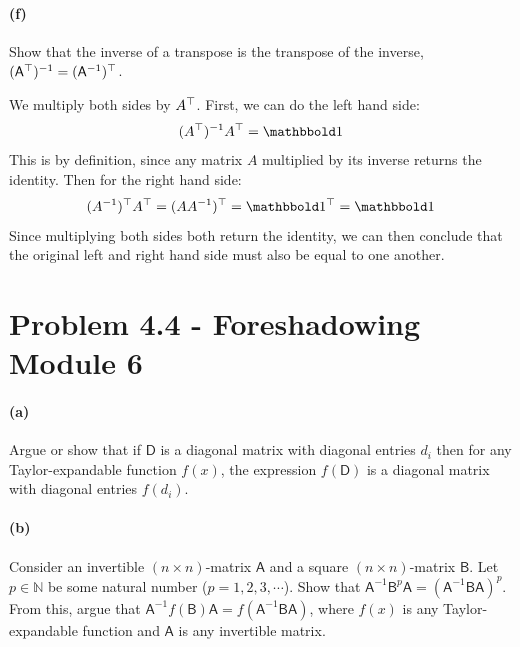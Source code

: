 \documentclass{article}
\begin{document}
\paragraph{(f)}		
Show that the inverse of a transpose is the transpose of the inverse, $(\mathsf{A}^{\top})^{-1} = (\mathsf{A}^{-1})^{\top}$.

\begin{solution}
	We multiply both sides by $A^\top$. First, we can do the left hand side:
	\[
	 (A^\T)^{-1} A^\T = \mathbbold 1
	\] 
	This is by definition, since any matrix $A$ multiplied by its inverse returns the identity. Then for the 
	right hand side:
	\[
		(A^{-1})^\T A^\T = (A A^{-1})^\T = \mathbbold 1^\T = \mathbbold 1
	\] 
	Since multiplying both sides both return the identity, we can then conclude that the original left and 
	right hand side must also be equal to one another. 
\end{solution}
\bigskip
\dphline
\pagebreak
\section*{Problem 4.4 - Foreshadowing Module 6}


\paragraph{(a)}		\extrapart
Argue or show that if $\mathsf{D}$ is a diagonal matrix with diagonal entries $d_{i}$ then for any Taylor-expandable function $f(x)$, the expression $f(\mathsf{D})$ is a 
diagonal matrix with diagonal entries $f(d_{i})$.\\


\paragraph{(b)}
Consider an invertible $(n\times n)$-matrix $\mathsf{A}$ and a square $(n\times n)$-matrix $\mathsf{B}$.  Let $p\in\mathbb{N}$ be some natural number ($p=1,2,3,\cdots$).
Show that $\mathsf{A}^{-1}\mathsf{B}^{p}\mathsf{A} = (\mathsf{A}^{-1}\mathsf{BA})^{p}$.  
From this, argue that $\mathsf{A}^{-1}f(\mathsf{B})\mathsf{A} = f(\mathsf{A}^{-1}\mathsf{BA})$, where $f(x)$ is any Taylor-expandable function and $\mathsf{A}$ is any invertible matrix.
\end{document}
